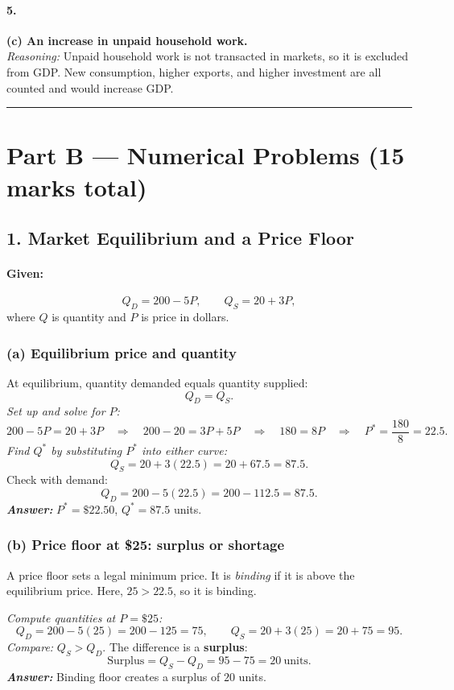 \documentclass[11pt]{article}
\begin{document}
\paragraph{5.} \textbf{(c) An increase in unpaid household work.}\\
\emph{Reasoning:} Unpaid household work is not transacted in markets, so it is excluded from GDP. New consumption, higher exports, and higher investment are all counted and would increase GDP.

\bigskip
\hrule
\bigskip
\newpage

\section*{Part B — Numerical Problems (15 marks total)}

\subsection*{1. Market Equilibrium and a Price Floor}

\paragraph{Given:}
\[
Q_D=200-5P,\qquad Q_S=20+3P,
\]
where \(Q\) is quantity and \(P\) is price in dollars.

\subsubsection*{(a) Equilibrium price and quantity}
At equilibrium, quantity demanded equals quantity supplied:
\[
Q_D=Q_S.
\]
\emph{Set up and solve for \(P\):}
\[
200-5P=20+3P
\quad\Rightarrow\quad
200-20=3P+5P
\quad\Rightarrow\quad
180=8P
\quad\Rightarrow\quad
P^\ast=\frac{180}{8}=22.5.
\]
\emph{Find \(Q^\ast\) by substituting \(P^\ast\) into either curve:}
\[
Q_S=20+3(22.5)=20+67.5=87.5.
\]
Check with demand:
\[
Q_D=200-5(22.5)=200-112.5=87.5.
\]
\emph{\textbf{Answer:}} \(P^\ast=\$22.50\), \(Q^\ast=87.5\) units.

\subsubsection*{(b) Price floor at \$25: surplus or shortage}
A price floor sets a legal minimum price. It is \emph{binding} if it is above the equilibrium price. Here, \(25>22.5\), so it is binding.

\emph{Compute quantities at \(P=\$25\):}
\[
Q_D=200-5(25)=200-125=75,\qquad
Q_S=20+3(25)=20+75=95.
\]
\emph{Compare:} \(Q_S>Q_D\). The difference is a \textbf{surplus}:
\[
\text{Surplus}=Q_S-Q_D=95-75=20\ \text{units}.
\]
\emph{\textbf{Answer:}} Binding floor creates a surplus of \(20\) units.
\end{document}

